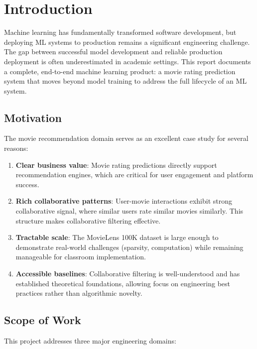 \section{Introduction}

Machine learning has fundamentally transformed software development, but deploying ML systems to production 
remains a significant engineering challenge. The gap between successful model development and reliable 
production deployment is often underestimated in academic settings. This report documents a complete, 
end-to-end machine learning product: a movie rating prediction system that moves beyond model training 
to address the full lifecycle of an ML system.

\subsection{Motivation}

The movie recommendation domain serves as an excellent case study for several reasons:

\begin{enumerate}
  \item \textbf{Clear business value}: Movie rating predictions directly support recommendation engines, 
  which are critical for user engagement and platform success.
  
  \item \textbf{Rich collaborative patterns}: User-movie interactions exhibit strong collaborative signal, 
  where similar users rate similar movies similarly. This structure makes collaborative filtering effective.
  
  \item \textbf{Tractable scale}: The MovieLens 100K dataset is large enough to demonstrate real-world 
  challenges (sparsity, computation) while remaining manageable for classroom implementation.
  
  \item \textbf{Accessible baselines}: Collaborative filtering is well-understood and has established 
  theoretical foundations, allowing focus on engineering best practices rather than algorithmic novelty.
\end{enumerate}

\subsection{Scope of Work}

This project addresses three major engineering domains:

